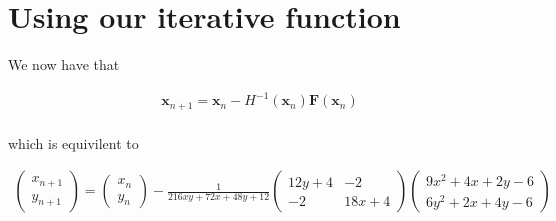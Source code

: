 \documentclass[../main.tex]{subfiles}
\begin{document}
    \section{Using our iterative function}\label{sec:2d-nr-iterative-function}
    We now have that
    \begin{center*}
        \begin{align*}
            \mathbf{x}_{n + 1} = \mathbf{x}_{n} - H^{-1}(\mathbf{x}_{n})\mathbf{F}(\mathbf{x}_{n}) \\
        \end{align*}
    \end{center*}
    which is equivilent to
    \begin{center*}
        \begin{align*}
            \begin{pmatrix}
                x_{n + 1} \\
                y_{n + 1}
            \end{pmatrix} = \begin{pmatrix}
                x_{n} \\
                y_{n}
            \end{pmatrix} - \frac{1}{216xy + 72x + 48y + 12}\begin{pmatrix}
                12y + 4 & -2 \\
                -2 & 18x + 4
            \end{pmatrix}\begin{pmatrix}
                9x^{2} + 4x + 2y - 6 \\
                6y^{2} + 2x + 4y - 6
            \end{pmatrix}
        \end{align*}
    \end{center*}
    
\end{document}
